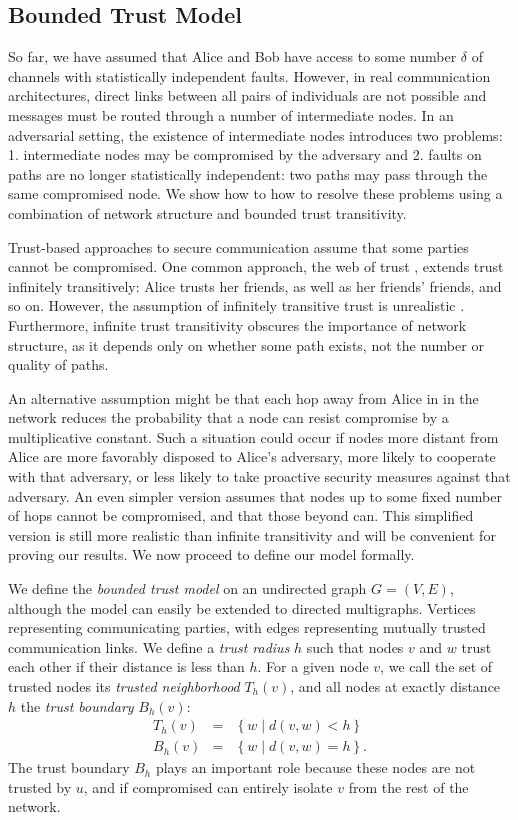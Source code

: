 \documentclass[10pt,letterpaper]{article}
\newcommand{\beq}{\begin{eqnarray}}
\newcommand{\eeq}{\end{eqnarray}}
\begin{document}
\subsection*{Bounded Trust Model}

So far, we have assumed that Alice and Bob have access to some number
$\delta$ of channels with statistically independent faults.
However, in real communication architectures, direct links between all
pairs of individuals are not possible and messages must be routed through
a number of intermediate nodes.
In an adversarial setting,
the existence of intermediate nodes introduces two problems:
1. intermediate nodes may be compromised by the adversary and
2. faults on paths are no longer statistically independent:
two paths may pass through the same compromised node.
We show how to how to resolve these problems using a combination of network
structure and bounded trust transitivity.

Trust-based approaches to secure communication assume that some parties
cannot be compromised.
One common approach, the web of trust
\cite{zimmermann_official_1995,richters_trust_2011},
extends trust infinitely transitively:
Alice trusts her friends, as well as her friends' friends, and so on.
However, the assumption of infinitely transitive trust is unrealistic
\cite{christianson_why_1997}.
Furthermore, infinite trust transitivity obscures the importance of network structure,
as it depends only on whether some path exists, not the number or quality of paths.

An alternative assumption might be that each hop away from Alice in
in the network reduces the probability that a node can resist compromise
by a multiplicative constant.
Such a situation could occur if nodes more distant from Alice are
more favorably disposed to Alice's adversary, more likely to cooperate with that
adversary, or less likely to take proactive security measures against that
adversary.
An even simpler version assumes that nodes up to some
fixed number of hops cannot be compromised, and that those beyond can.
This simplified version is still more realistic than infinite transitivity
and will be convenient for proving our results.
We now proceed to define our model formally.

We define the {\em bounded trust model} on
an undirected graph $G = (V,E)$,
although the model can easily be extended to directed multigraphs.
Vertices representing communicating parties,
with edges representing mutually trusted communication links.
We define a {\em trust radius} $h$ such that nodes $v$ and
$w$ trust each other if their distance is less than $h$.
For a given node $v$,
we call the set of trusted nodes its
{\em trusted neighborhood} $T_h(v)$,
and all nodes at exactly distance $h$ the
{\em trust boundary} $B_h(v)$:
\beq
T_h(v) &=& \left\{ w \mid d(v,w) < h \right\} \\
B_h(v) &=& \left\{ w \mid d(v,w) = h \right\}.
\eeq
The trust boundary $B_h$ plays an important role because these nodes are not
trusted by $u$,
and if compromised can entirely isolate $v$ from the rest of the network.
\end{document}
